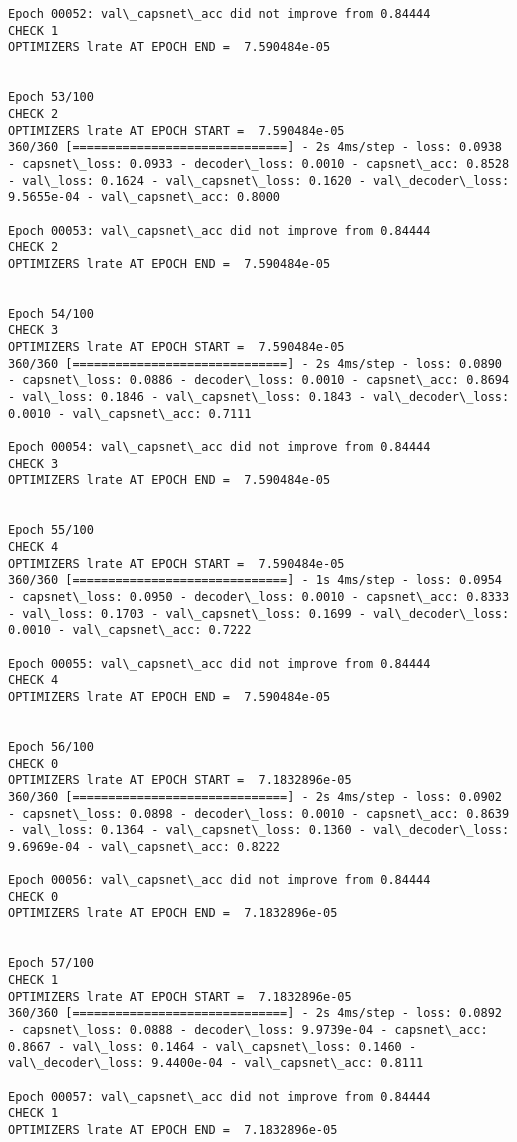 \documentclass[11pt]{article}
\begin{document}
\begin{Verbatim}[commandchars=\\\{\}]
Epoch 00052: val\_capsnet\_acc did not improve from 0.84444
CHECK 1
OPTIMIZERS lrate AT EPOCH END =  7.590484e-05 


Epoch 53/100
CHECK 2
OPTIMIZERS lrate AT EPOCH START =  7.590484e-05
360/360 [==============================] - 2s 4ms/step - loss: 0.0938 - capsnet\_loss: 0.0933 - decoder\_loss: 0.0010 - capsnet\_acc: 0.8528 - val\_loss: 0.1624 - val\_capsnet\_loss: 0.1620 - val\_decoder\_loss: 9.5655e-04 - val\_capsnet\_acc: 0.8000

Epoch 00053: val\_capsnet\_acc did not improve from 0.84444
CHECK 2
OPTIMIZERS lrate AT EPOCH END =  7.590484e-05 


Epoch 54/100
CHECK 3
OPTIMIZERS lrate AT EPOCH START =  7.590484e-05
360/360 [==============================] - 2s 4ms/step - loss: 0.0890 - capsnet\_loss: 0.0886 - decoder\_loss: 0.0010 - capsnet\_acc: 0.8694 - val\_loss: 0.1846 - val\_capsnet\_loss: 0.1843 - val\_decoder\_loss: 0.0010 - val\_capsnet\_acc: 0.7111

Epoch 00054: val\_capsnet\_acc did not improve from 0.84444
CHECK 3
OPTIMIZERS lrate AT EPOCH END =  7.590484e-05 


Epoch 55/100
CHECK 4
OPTIMIZERS lrate AT EPOCH START =  7.590484e-05
360/360 [==============================] - 1s 4ms/step - loss: 0.0954 - capsnet\_loss: 0.0950 - decoder\_loss: 0.0010 - capsnet\_acc: 0.8333 - val\_loss: 0.1703 - val\_capsnet\_loss: 0.1699 - val\_decoder\_loss: 0.0010 - val\_capsnet\_acc: 0.7222

Epoch 00055: val\_capsnet\_acc did not improve from 0.84444
CHECK 4
OPTIMIZERS lrate AT EPOCH END =  7.590484e-05 


Epoch 56/100
CHECK 0
OPTIMIZERS lrate AT EPOCH START =  7.1832896e-05
360/360 [==============================] - 2s 4ms/step - loss: 0.0902 - capsnet\_loss: 0.0898 - decoder\_loss: 0.0010 - capsnet\_acc: 0.8639 - val\_loss: 0.1364 - val\_capsnet\_loss: 0.1360 - val\_decoder\_loss: 9.6969e-04 - val\_capsnet\_acc: 0.8222

Epoch 00056: val\_capsnet\_acc did not improve from 0.84444
CHECK 0
OPTIMIZERS lrate AT EPOCH END =  7.1832896e-05 


Epoch 57/100
CHECK 1
OPTIMIZERS lrate AT EPOCH START =  7.1832896e-05
360/360 [==============================] - 2s 4ms/step - loss: 0.0892 - capsnet\_loss: 0.0888 - decoder\_loss: 9.9739e-04 - capsnet\_acc: 0.8667 - val\_loss: 0.1464 - val\_capsnet\_loss: 0.1460 - val\_decoder\_loss: 9.4400e-04 - val\_capsnet\_acc: 0.8111

Epoch 00057: val\_capsnet\_acc did not improve from 0.84444
CHECK 1
OPTIMIZERS lrate AT EPOCH END =  7.1832896e-05 



\end{Verbatim}
\end{document}
